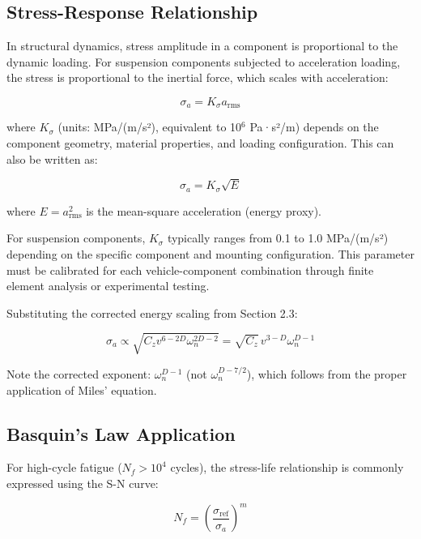 \documentclass[11pt]{article}
\begin{document}
\subsection{Stress-Response Relationship}

In structural dynamics, stress amplitude in a component is proportional to the dynamic loading. For suspension components subjected to acceleration loading, the stress is proportional to the inertial force, which scales with acceleration:

\begin{equation}
\sigma_a = K_\sigma a_{\text{rms}}
\end{equation}

where $K_\sigma$ (units: MPa/(m/s²), equivalent to 10$^6$ Pa·s²/m) depends on the component geometry, material properties, and loading configuration. This can also be written as:

\begin{equation}
\sigma_a = K_\sigma \sqrt{E}
\end{equation}

where $E = a_{\text{rms}}^2$ is the mean-square acceleration (energy proxy).

For suspension components, $K_\sigma$ typically ranges from 0.1 to 1.0 MPa/(m/s²) depending on the specific component and mounting configuration. This parameter must be calibrated for each vehicle-component combination through finite element analysis or experimental testing.

Substituting the corrected energy scaling from Section 2.3:

\begin{equation}
\sigma_a \propto \sqrt{C_z v^{6-2D} \omega_n^{2D-2}} = \sqrt{C_z} \, v^{3-D} \omega_n^{D-1}
\end{equation}

Note the corrected exponent: $\omega_n^{D-1}$ (not $\omega_n^{D-7/2}$), which follows from the proper application of Miles' equation.

\subsection{Basquin's Law Application}

For high-cycle fatigue ($N_f > 10^4$ cycles), the stress-life relationship is commonly expressed using the S-N curve:

\begin{equation}
N_f = \left(\frac{\sigma_{\text{ref}}}{\sigma_a}\right)^m
\end{equation}
\end{document}
